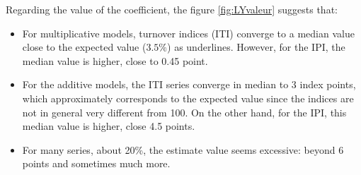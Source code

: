 \documentclass[12pt, a4paper]{article}
\begin{document}
Regarding the value of the coefficient, the figure \ref{fig:LYvaleur} suggests that:
\begin{itemize}
	\item For multiplicative models, turnover indices (ITI) converge to a median value close to the expected value ($3.5\%$) as \cite{B1992} underlines. However, for the IPI, the median value is higher, close to 0.45 point.
	\item For the additive models, the ITI series converge in median to 3 index points, which approximately corresponds to the expected value since the indices are not in general very different from 100. On the other hand, for the IPI, this median value is higher, close 4.5 points.
	\item For many series, about 20\%, the estimate value seems excessive: beyond 6 points and sometimes much more.
\end{itemize}
\end{document}
